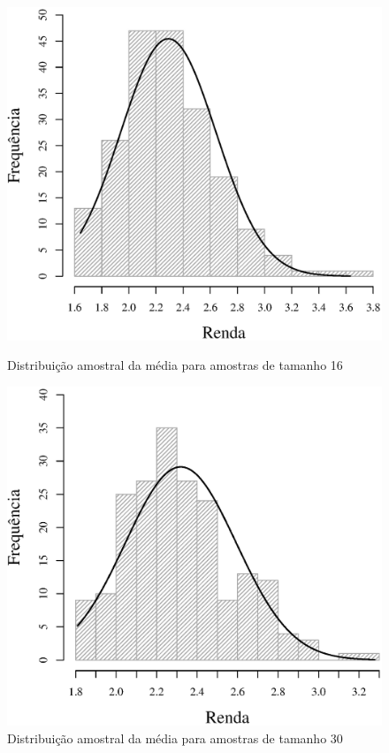 \begin{figure}[h]
\begin{minipage}{0.50\textwidth}
	\includegraphics[width=\linewidth]{plots/histogram_renda_n16.eps}
	\caption{Distribuição amostral da média para amostras de tamanho 16}
	\label{fig:m16}
\end{minipage}
\begin{minipage}{0.50\textwidth}
	\includegraphics[width=\linewidth]{plots/histogram_renda_n30.eps}
	\caption{Distribuição amostral da média para amostras de tamanho 30}
	\label{fig:m30}
\end{minipage}
\end{figure}

